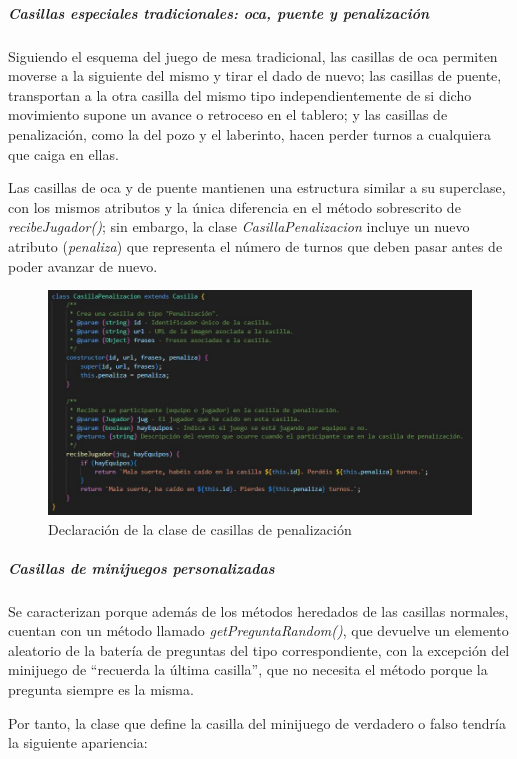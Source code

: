 \subparagraph{Casillas especiales tradicionales: oca, puente y penalización}

Siguiendo el esquema del juego de mesa tradicional, las casillas de oca permiten moverse a la siguiente del mismo y tirar el dado de nuevo; las casillas de puente, transportan a la otra casilla del mismo tipo independientemente de si dicho movimiento supone un avance o retroceso en el tablero; y las casillas de penalización, como la del pozo y el laberinto, hacen perder turnos a cualquiera que caiga en ellas.

Las casillas de oca y de puente mantienen una estructura similar a su superclase, con los mismos atributos y la única diferencia en el método sobrescrito de \textit{recibeJugador()}; sin embargo, la clase \textit{CasillaPenalizacion} incluye un nuevo atributo (\textit{penaliza}) que representa el número de turnos que deben pasar antes de poder avanzar de nuevo.

\begin{figure}[H]
	\centering
	\includegraphics{imgs/codigo-casillas-3.jpg}
	\caption{Declaración de la clase de casillas de penalización}
	\label{fig:codigo-casillas-3}
\end{figure}

\subparagraph{Casillas de minijuegos personalizadas}

Se caracterizan porque además de los métodos heredados de las casillas normales, cuentan con un método llamado \textit{getPreguntaRandom()}, que devuelve un elemento aleatorio de la batería de preguntas del tipo correspondiente, con la excepción del minijuego de \enquote{recuerda la última casilla}, que no necesita el método porque la pregunta siempre es la misma.

Por tanto, la clase que define la casilla del minijuego de verdadero o falso tendría la siguiente apariencia:

